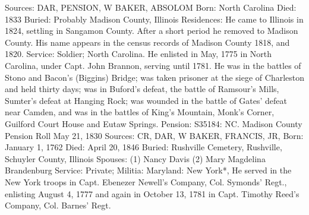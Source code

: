 Sources: DAR, PENSION, W 
BAKER, ABSOLOM 
Born: North Carolina 
Died: 1833 
Buried: Probably Madison County, Illinois 
Residences: He came to Illinois in 1824, settling in Sangamon County. After a short period he removed to Madison County. His name appears in the census records of Madison County 1818, and 1820. 
Service: Soldier; North Carolina. He enlisted in May, 1775 in North Carolina, under Capt. John Brannon, serving until 1781. He was in the battles of Stono and Bacon's (Biggins) Bridge; was taken prisoner at the siege of Charleston and held thirty days; was in Buford's defeat, the battle of Ramsour's Mills, Sumter's defeat at Hanging Rock; was wounded in the battle of Gates' defeat near Camden, and was in the battles of King's Mountain, Monk's Corner, Guilford Court House and Eutaw Springs. 
Pension: S35184: NC. Madison County Pension Roll May 21, 1830 
Sources: CR, DAR, W 
BAKER, FRANCIS, JR, 
Born: January 1, 1762 
Died: April 20, 1846 
Buried: Rushville Cemetery, Rushville, Schuyler County, Illinois 
Spouses: (1) Nancy Davis 
     (2) Mary Magdelina Brandenburg 
Service: Private; Militia: Maryland: New York*, He served in the New York troops in Capt. Ebenezer Newell's Company, Col. Symonds' Regt., enlisting August 4, 1777 and again in October 13, 1781 in Capt. Timothy Reed's Company, Col. Barnes' Regt.

